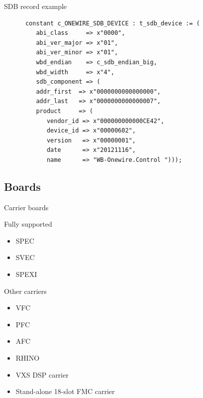 \documentclass[compress,red]{beamer}
\begin{document}
\begin{frame}[fragile]{SDB record example}

    \begin{verbatim}
      constant c_ONEWIRE_SDB_DEVICE : t_sdb_device := (
         abi_class     => x"0000",
         abi_ver_major => x"01",
         abi_ver_minor => x"01",
         wbd_endian    => c_sdb_endian_big,
         wbd_width     => x"4",
         sdb_component => (
         addr_first  => x"0000000000000000",
         addr_last   => x"0000000000000007",
         product     => (
            vendor_id => x"000000000000CE42",
            device_id => x"00000602",
            version   => x"00000001",
            date      => x"20121116",
            name      => "WB-Onewire.Control ")));
    \end{verbatim}

\end{frame}

\subsection{Boards}

\begin{frame}{Carrier boards}

  \begin{block}{Fully supported}
    \begin{itemize}
    \item
      SPEC
    \item
      SVEC
    \item
      SPEXI
    \end{itemize}
  \end{block}

  \begin{block}{Other carriers}
    \begin{itemize}
    \item
      VFC
    \item
      PFC
    \item
      AFC
    \item
      RHINO
    \item
      VXS DSP carrier
    \item
      Stand-alone 18-slot FMC carrier
    \end{itemize}
  \end{block}

\end{frame}
\end{document}
